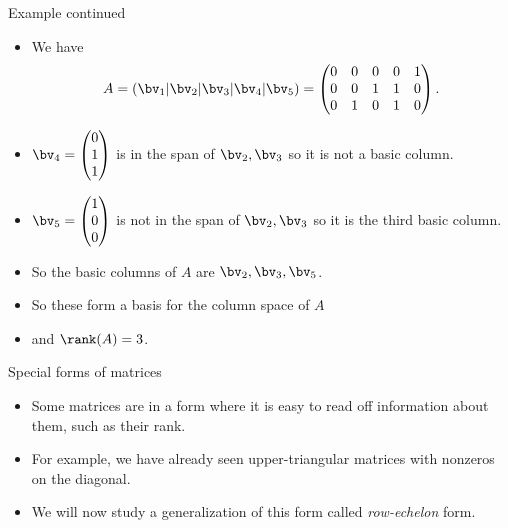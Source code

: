 \documentclass{beamer}
\begin{document}
\begin{frame}{Example continued}

\begin{itemize}
\item We have
$$A = \left(\bv_1 \vert \bv_2 \vert \bv_3 \vert \bv_4 \vert \bv_5 \right) =
\begin{pmatrix}
0 & 0 & 0 & 0 & 1 \\
0 & 0 & 1 & 1 & 0 \\
0 & 1 & 0 & 1 & 0 \\
\end{pmatrix}.
$$
\item $\bv_4
=
\begin{pmatrix}
0 \\
1 \\
1 \\
\end{pmatrix}
$
is in the span of $\bv_2,\bv_3$ so it is not a basic column.
\item $\bv_5
=
\begin{pmatrix}
1 \\
0 \\
0 \\
\end{pmatrix}
$
is not in the span of $\bv_2,\bv_3$ so it is the third basic column.
\item So the basic columns of $A$ are $\bv_2,\bv_3,\bv_5$.
\item So these form a basis for the column space of $A$
\item and $\rank(A) = 3$.
\end{itemize}

\end{frame}


\begin{frame}{Special forms of matrices}

\begin{itemize}
\item Some matrices are in a form where it is easy to read off information
about them, such as their rank.
\item For example, we have already seen upper-triangular matrices with
nonzeros on the diagonal.
\item We will now study a generalization of this form called \emph{row-echelon} form.
\end{itemize}


\end{frame}
\end{document}
